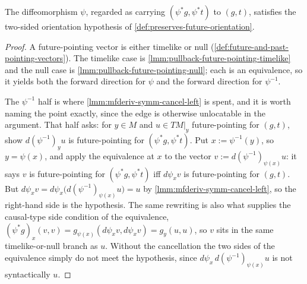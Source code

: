 \begin{lemma}
    \label{lmm:pullback-preserves-future-orientation}
    \leanok
    The diffeomorphism $\psi$, regarded as carrying $(\psi^*g, \psi^*t)$ to $(g,t)$, satisfies the two-sided orientation hypothesis of \ref{def:preserves-future-orientation}.
\end{lemma}
\begin{proof}
    \leanok
    A future-pointing vector is either timelike or null (\ref{def:future-and-past-pointing-vectors}). The timelike case is \ref{lmm:pullback-future-pointing-timelike} and the null case is \ref{lmm:pullback-future-pointing-null}; each is an equivalence, so it yields both the forward direction for $\psi$ and the forward direction for $\psi^{-1}$.

    The $\psi^{-1}$ half is where \ref{lmm:mfderiv-symm-cancel-left} is spent, and it is worth naming the point exactly, since the edge is otherwise unlocatable in the argument. That half asks: for $y \in M$ and $u \in TM|_y$ future-pointing for $(g,t)$, show $d(\psi^{-1})_y u$ is future-pointing for $(\psi^*g, \psi^*t)$. Put $x := \psi^{-1}(y)$, so $y = \psi(x)$, and apply the equivalence at $x$ to the vector $v := d(\psi^{-1})_{\psi(x)}u$: it says $v$ is future-pointing for $(\psi^*g,\psi^*t)$ iff $d\psi_x v$ is future-pointing for $(g,t)$. But $d\psi_x v = d\psi_x\big(d(\psi^{-1})_{\psi(x)}u\big) = u$ by \ref{lmm:mfderiv-symm-cancel-left}, so the right-hand side is the hypothesis. The same rewriting is also what supplies the causal-type side condition of the equivalence, $(\psi^*g)_x(v,v) = g_{\psi(x)}(d\psi_x v, d\psi_x v) = g_y(u,u)$, so $v$ sits in the same timelike-or-null branch as $u$. Without the cancellation the two sides of the equivalence simply do not meet the hypothesis, since $d\psi_x\,d(\psi^{-1})_{\psi(x)}u$ is not syntactically $u$.
\end{proof}

